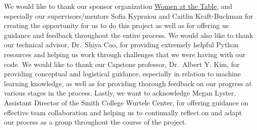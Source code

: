 \documentclass[water,article,submit,moreauthors,pdftex]{mdpi}
\begin{document}
We would like to thank our sponsor organization
\href{https://www.womenatthetable.net/}{Women at the Table}, and
especially our supervisors/mentors Sofia Kypraiou and Caitlin
Kraft-Buchman for creating the opportunity for us to do this project as
well as for offering us guidance and feedback throughout the entire
process. We would also like to thank our technical advisor, Dr.~Shiya
Cao, for providing extremely helpful Python resources and helping us
work through challenges that we were having with our code. We would like
to thank our Capstone professor, Dr.~Albert Y. Kim, for providing
conceptual and logistical guidance, especially in relation to machine
learning knowledge, as well as for providing thorough feedback on our
progress at various stages in the process. Lastly, we want to
acknowledge Megan Lyster, Assistant Director of the Smith College
Wurtele Center, for offering guidance on effective team collaboration
and helping us to continually reflect on and adapt our process as a
group throughout the course of the project.

%

\vspace{6pt}


\end{document}
